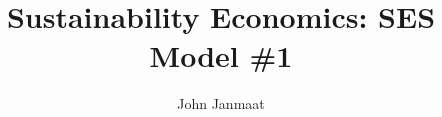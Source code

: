 \documentclass[10pt, aspectratio=169]{beamer}
\title{Sustainability Economics: SES Model \#1}
\author{John Janmaat}
\begin{document}
	
	\frame{\titlepage}
	
	
	
\end{document}
